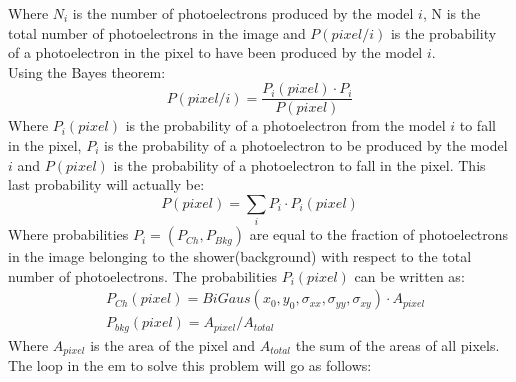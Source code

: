 \documentclass[main.tex]{subfiles}
\begin{document}
Where $N_i$ is the number of photoelectrons produced by the model $i$, N is the total number of photoelectrons in the image and $P(pixel/i)$ is the probability of a photoelectron in the pixel to have been produced by the model $i$.\\
Using the Bayes theorem:
\begin{equation}\label{eq:bayes}
  P(pixel/i) = \frac{P_i(pixel) \cdot P_i}{P(pixel)}
\end{equation}
Where $P_i(pixel)$ is the probability of a photoelectron from the model $i$ to fall in the pixel, $P_i$ is the probability of a photoelectron to be produced by the model $i$ and $P(pixel)$ is the probability of a photoelectron to fall in the pixel. This last probability will actually be:
\begin{equation}
P(pixel) = \sum_{i} P_i \cdot P_i(pixel)
\end{equation}
Where probabilities $P_i=(P_{Ch}, P_{Bkg})$ are equal to the fraction of photoelectrons in the image belonging to the shower(background) with respect to the total number of photoelectrons. The probabilities $P_i(pixel)$ can be written as:
\begin{equation}
  \begin{split}
  & P_{Ch}(pixel) = BiGaus(x_{0}, y_{0},\sigma_{xx}, \sigma_{yy}, \sigma_{xy}) \cdot A_{pixel}\\
  & P_{bkg}(pixel) = A_{pixel}/A_{total}
  \end{split}
\end{equation}
Where $A_{pixel}$ is the area of the pixel and $A_{total}$ the sum of the areas of all pixels.\\
The loop in the \gls{em} to solve this problem will go as follows:
\end{document}
